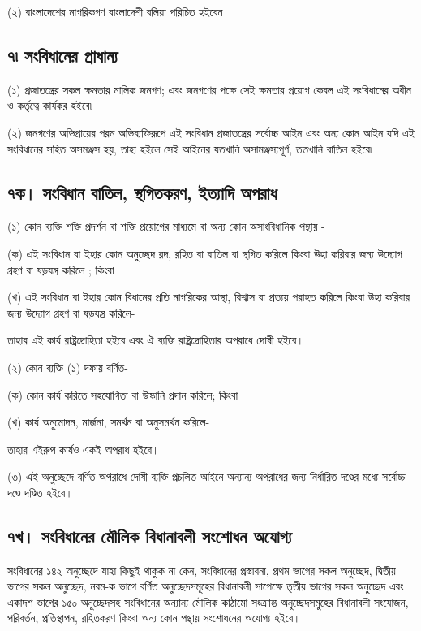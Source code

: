 \documentclass[11pt]{article}
\begin{document}
(২) বাংলাদেশের নাগরিকগণ বাংলাদেশী বলিয়া পরিচিত হইবেন

\subsection{৭৷ সংবিধানের প্রাধান্য}
\label{sec:org9b5fbb2}
(১) প্রজাতন্ত্রের সকল ক্ষমতার মালিক জনগণ; এবং জনগণের পক্ষে সেই ক্ষমতার প্রয়োগ
    কেবল এই সংবিধানের অধীন ও কর্তৃত্বে কার্যকর হইবে৷

(২) জনগণের অভিপ্রায়ের পরম অভিব্যক্তিরূপে এই সংবিধান প্রজাতন্ত্রের সর্বোচ্চ আইন
    এবং অন্য কোন আইন যদি এই সংবিধানের সহিত অসমঞ্জস হয়, তাহা হইলে সেই আইনের
    যতখানি অসামঞ্জস্যপূর্ণ, ততখানি বাতিল হইবে৷

\subsection{৭ক। সংবিধান বাতিল, স্থগিতকরণ, ইত্যাদি অপরাধ}
\label{sec:orgaf3df3d}
(১) কোন ব্যক্তি শক্তি প্রদর্শন বা শক্তি প্রয়োগের মাধ্যমে বা অন্য কোন
   অসাংবিধানিক পন্থায় -

(ক) এই সংবিধান বা ইহার কোন অনুচ্ছেদ রদ, রহিত বা বাতিল বা স্থগিত করিলে
    কিংবা উহা করিবার জন্য উদ্যোগ গ্রহণ বা ষড়যন্ত্র করিলে ; কিংবা

(খ) এই সংবিধান বা ইহার কোন বিধানের প্রতি নাগরিকের আস্থা, বিশ্বাস বা প্রত্যয়
    পরাহত করিলে কিংবা উহা করিবার জন্য উদ্যোগ গ্রহণ বা ষড়যন্ত্র করিলে-

তাহার এই কার্য রাষ্ট্রদ্রোহিতা হইবে এবং ঐ ব্যক্তি রাষ্ট্রদ্রোহিতার অপরাধে দোষী
হইবে।

(২) কোন ব্যক্তি (১) দফায় বর্ণিত-

(ক) কোন কার্য করিতে সহযোগিতা বা উস্কানি প্রদান করিলে; কিংবা

(খ) কার্য অনুমোদন, মার্জনা, সমর্থন বা অনুসমর্থন করিলে-

তাহার এইরুপ কার্যও একই অপরাধ হইবে।

(৩) এই অনুচ্ছেদে বর্ণিত অপরাধে দোষী ব্যক্তি প্রচলিত আইনে অন্যান্য অপরাধের জন্য
    নির্ধারিত দণ্ডের মধ্যে সর্বোচ্চ দণ্ডে দণ্ডিত হইবে।

\subsection{৭খ। সংবিধানের মৌলিক বিধানাবলী সংশোধন অযোগ্য}
\label{sec:org584979b}
সংবিধানের ১৪২ অনুচ্ছেদে যাহা কিছুই থাকুক না কেন, সংবিধানের প্রস্তাবনা, প্রথম
ভাগের সকল অনুচ্ছেদ, দ্বিতীয় ভাগের সকল অনুচ্ছেদ, নবম-ক ভাগে বর্ণিত
অনুচ্ছেদসমূহের বিধানাবলী সাপেক্ষে তৃতীয় ভাগের সকল অনুচ্ছেদ এবং একাদশ ভাগের
১৫০ অনুচ্ছেদসহ সংবিধানের অন্যান্য মৌলিক কাঠামো সংক্রান্ত অনুচ্ছেদসমুহের
বিধানাবলী সংযোজন, পরিবর্তন, প্রতিস্থাপন, রহিতকরণ কিংবা অন্য কোন পন্থায়
সংশোধনের অযোগ্য হইবে।
\end{document}
